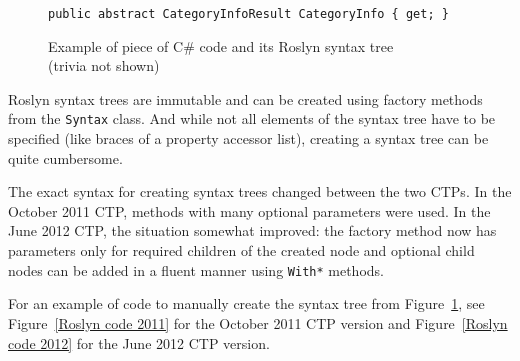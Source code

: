 \begin{figure}[htbp]

\begin{lstlisting}
public abstract CategoryInfoResult CategoryInfo { get; }
\end{lstlisting}

\begin{center}
\end{center}

\caption[Example of piece of C\# code and its Roslyn syntax tree]
{Example of piece of C\# code and its Roslyn syntax tree \\ (trivia not shown)}
\label{Syntax tree}
\end{figure}

\pagebreak[0]

Roslyn syntax trees are immutable and can be created using factory methods from the \lstinline{Syntax} class.
And while not all elements of the syntax tree have to be specified (like braces of a property accessor list),
creating a syntax tree can be quite cumbersome.

The exact syntax for creating syntax trees changed between the two \acp{CTP}.
In the October 2011 \ac{CTP}, methods with many optional parameters were used.
In the June 2012 \ac{CTP}, the situation somewhat improved:
the factory method now has parameters only for required children of the created node
and optional child nodes can be added in a fluent manner using \lstinline{With*} methods.

For an example of code to manually create the syntax tree from Figure~\ref{Syntax tree},
see Figure~\ref{Roslyn code 2011} for the October 2011 \ac{CTP} version and
Figure~\ref{Roslyn code 2012} for the June 2012 \ac{CTP} version.


